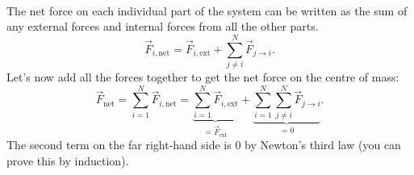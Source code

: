 \documentclass[../classical_mechanics.tex]{subfiles}
\begin{document}
        \paragraph{}
        The net force on each individual part of the system can be written as the sum of any external forces and internal forces from all the other parts.
        \begin{equation}
            \vec{F}_{i,\text{net}}=\vec{F}_{i,\text{ext}}+\sum_{j\neq i}^N\vec{F}_{j\to i}.
        \end{equation}
        Let's now add all the forces together to get the net force on the centre of mass:
        \begin{equation}
            \vec{F}_\text{net} = \sum_{i=1}^N\vec{F}_{i,\text{net}} = \underbrace{\sum_{i=1}^N\vec{F}_{i,\text{ext}}}_{=\vec{F}_\text{ext}}+\underbrace{\sum_{i=1}^N\sum_{j\neq i}^N\vec{F}_{j\to i}}_{=0}.
        \end{equation}
        The second term on the far right-hand side is 0 by Newton's third law (you can prove this by induction).
        
\end{document}
